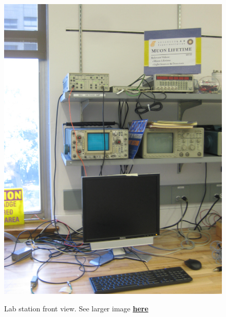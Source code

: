 \documentclass{../lab}
\begin{document}
\begin{figure}[h]
\begin{minipage}{0.24\textwidth}
    \href{http://experimentationlab.berkeley.edu/sites/default/files/images/MUO_3517.jpg}{\includegraphics[width=\linewidth,keepaspectratio]{images/MUO_3517.jpg}}
    \caption{Lab station front view. See larger image \href{http://experimentationlab.berkeley.edu/sites/default/files/images/MUO_3517.jpg}{\textbf{here}}}
\end{minipage}
\begin{minipage}{0.24\textwidth}

\end{minipage}
\end{figure}
\end{document}

